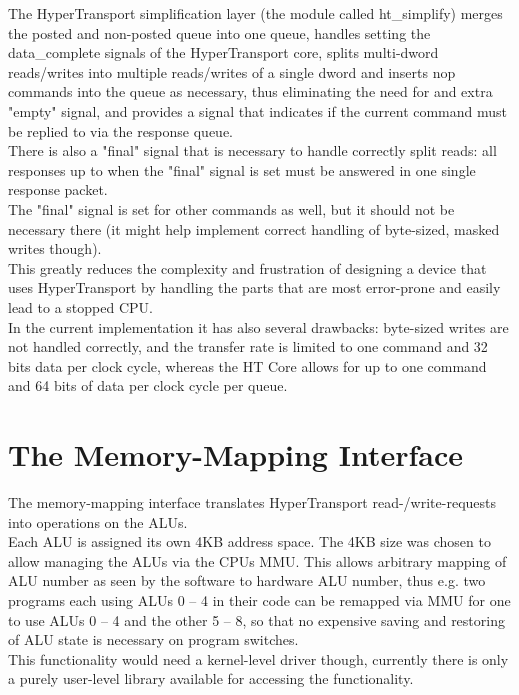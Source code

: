 The HyperTransport simplification layer (the module called ht\_simplify)
merges the posted and non-posted queue into one queue, handles setting
the data\_complete signals of the HyperTransport core, splits multi-dword
reads/writes into multiple reads/writes of a single dword and inserts nop
commands into the queue as necessary, thus eliminating the need for
and extra "empty" signal, and provides a signal that indicates
if the current command must be replied to via the response queue.\\
There is also a "final" signal that is necessary to handle correctly
split reads: all responses up to when the "final" signal is set
must be answered in one single response packet.\\
The "final" signal is set for other commands as well, but it should
not be necessary there (it might help implement correct handling
of byte-sized, masked writes though).\\
This greatly reduces the complexity and frustration of designing a device
that uses HyperTransport by handling the parts that are most error-prone
and easily lead to a stopped CPU.\\
In the current implementation it has also several drawbacks: byte-sized
writes are not handled correctly, and the transfer rate is limited to one command
and 32 bits data per clock cycle, whereas the HT Core allows for up to one
command and 64 bits of data per clock cycle per queue.\\

\section{The Memory-Mapping Interface}

The memory-mapping interface translates HyperTransport read-/write-requests into
operations on the ALUs.\\
Each ALU is assigned its own 4KB address space. The 4KB size was chosen to allow
managing the ALUs via the CPUs MMU.
This allows arbitrary mapping of ALU number as seen by the software to hardware
ALU number, thus e.g. two programs each using ALUs 0 -- 4 in their code can be remapped
via MMU for one to use ALUs 0 -- 4 and the other 5 -- 8, so that no expensive saving and
restoring of ALU state is necessary on program switches.\\
This functionality would need a kernel-level driver though, currently there is only
a purely user-level library available for accessing the functionality.\\

